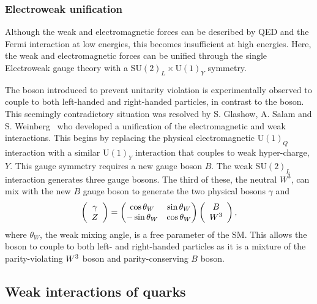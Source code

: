 \subsubsection{Electroweak unification}

Although the weak and electromagnetic forces can be described by QED and the Fermi interaction at low energies, this becomes insufficient at high energies. Here, the weak and electromagnetic forces can be unified through the single Electroweak gauge theory with a $\text{SU}(2)_{L}\times\text{U}(1)_{Y}$ symmetry.

The \Z boson introduced to prevent unitarity violation is experimentally observed to couple to both left-handed and right-handed particles, in contrast to the \Wpm boson. This seemingly contradictory situation was resolved by S. Glashow, A. Salam and S. Weinberg~\cite{Glashow:1959wxa,Salam:1968rm,Weinberg:1967tq} who developed a unification of the electromagnetic and weak interactions. 
This begins by replacing the physical electromagnetic $\text{U}(1)_{Q}$ interaction with a similar $\text{U}(1)_{Y}$ interaction that couples to weak hyper-charge, $Y$. This gauge symmetry requires a new gauge boson $B$. The weak $\text{SU}(2)_{L}$ interaction generates three gauge bosons. The third of these, the neutral $W^{3}$, can mix with the new $B$ gauge boson to generate the two physical bosons $\gamma$ and \Z
\begin{equation}
\left( \begin{array}{c} \gamma \\ {Z} \end{array} \right) = \begin{pmatrix} \cos{\theta_{W}} & \sin{\theta_{W}} \\ -\sin{\theta_{W}} & \cos{\theta_{W}} \end{pmatrix} \left( \begin{array}{c} B \\ W^{3} \end{array} \right),
\end{equation}
where $\theta_{W}$, the weak mixing angle, is a free parameter of the SM. 
This allows the \Z boson to couple to both left- and right-handed particles as it is a mixture of the parity-violating ${W}^{3}$ boson and parity-conserving $B$ boson.  


\subsection{Weak interactions of quarks}


